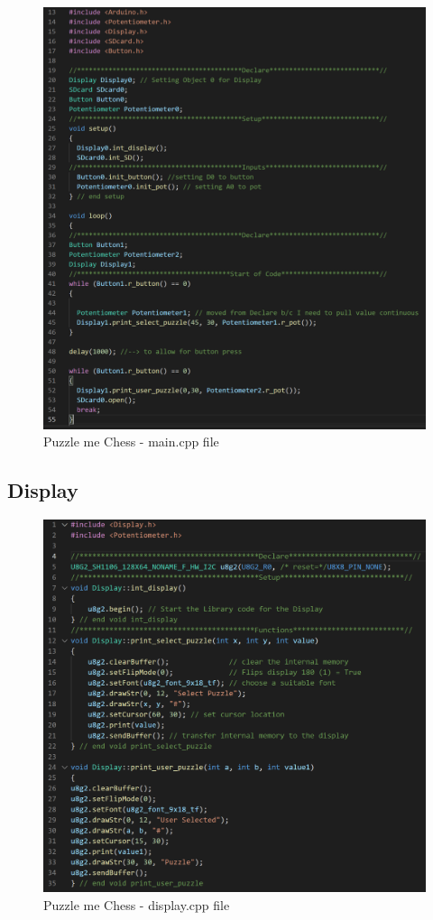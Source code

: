 \documentclass[11pt]{article}
\begin{document}
\begin{figure}
  \includegraphics[width=\linewidth]{./Pics/maincpp.PNG}
  \caption{Puzzle me Chess - main.cpp file}
  \label{fig:main}
\end{figure}

\subsection{Display}

\begin{figure}
  \includegraphics[width=\linewidth]{./Pics/Displaycpp.PNG}
  \caption{Puzzle me Chess - display.cpp file}
  \label{fig:Display}
\end{figure}
\end{document}
